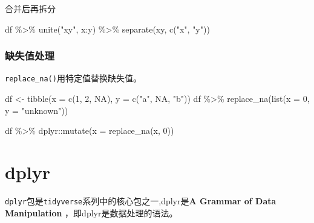 \documentclass[
]{book}
\newenvironment{Shaded}{\begin{snugshade}}{\end{snugshade}}
\newcommand{\AttributeTok}[1]{\textcolor[rgb]{0.77,0.63,0.00}{#1}}
\newcommand{\ConstantTok}[1]{\textcolor[rgb]{0.00,0.00,0.00}{#1}}
\newcommand{\DecValTok}[1]{\textcolor[rgb]{0.00,0.00,0.81}{#1}}
\newcommand{\FunctionTok}[1]{\textcolor[rgb]{0.00,0.00,0.00}{#1}}
\newcommand{\NormalTok}[1]{#1}
\newcommand{\OtherTok}[1]{\textcolor[rgb]{0.56,0.35,0.01}{#1}}
\newcommand{\SpecialCharTok}[1]{\textcolor[rgb]{0.00,0.00,0.00}{#1}}
\newcommand{\StringTok}[1]{\textcolor[rgb]{0.31,0.60,0.02}{#1}}
\begin{document}
合并后再拆分

\begin{Shaded}
\begin{Highlighting}[]
\NormalTok{df }\SpecialCharTok{\%\textgreater{}\%}
  \FunctionTok{unite}\NormalTok{(}\StringTok{"xy"}\NormalTok{, x}\SpecialCharTok{:}\NormalTok{y) }\SpecialCharTok{\%\textgreater{}\%}
  \FunctionTok{separate}\NormalTok{(xy, }\FunctionTok{c}\NormalTok{(}\StringTok{"x"}\NormalTok{, }\StringTok{"y"}\NormalTok{))}
\end{Highlighting}
\end{Shaded}

\hypertarget{ux7f3aux5931ux503cux5904ux7406}{%
\subsection{缺失值处理}\label{ux7f3aux5931ux503cux5904ux7406}}

\texttt{replace\_na()}用特定值替换缺失值。

\begin{Shaded}
\begin{Highlighting}[]
\NormalTok{df }\OtherTok{\textless{}{-}} \FunctionTok{tibble}\NormalTok{(}\AttributeTok{x =} \FunctionTok{c}\NormalTok{(}\DecValTok{1}\NormalTok{, }\DecValTok{2}\NormalTok{, }\ConstantTok{NA}\NormalTok{), }\AttributeTok{y =} \FunctionTok{c}\NormalTok{(}\StringTok{"a"}\NormalTok{, }\ConstantTok{NA}\NormalTok{, }\StringTok{"b"}\NormalTok{))}
\NormalTok{df }\SpecialCharTok{\%\textgreater{}\%} \FunctionTok{replace\_na}\NormalTok{(}\FunctionTok{list}\NormalTok{(}\AttributeTok{x =} \DecValTok{0}\NormalTok{, }\AttributeTok{y =} \StringTok{"unknown"}\NormalTok{))}
\end{Highlighting}
\end{Shaded}

\begin{Shaded}
\begin{Highlighting}[]
\NormalTok{df }\SpecialCharTok{\%\textgreater{}\%}\NormalTok{ dplyr}\SpecialCharTok{::}\FunctionTok{mutate}\NormalTok{(}\AttributeTok{x =} \FunctionTok{replace\_na}\NormalTok{(x, }\DecValTok{0}\NormalTok{))}
\end{Highlighting}
\end{Shaded}

\hypertarget{dplyr}{%
\chapter{dplyr}\label{dplyr}}

\texttt{dplyr}包是\texttt{tidyverse}系列中的核心包之一,dplyr是\textbf{A Grammar of Data Manipulation }，即dplyr是数据处理的语法。
\end{document}
